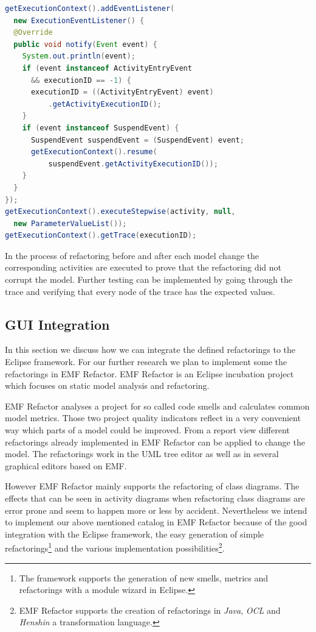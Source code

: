 \documentclass{llncs}
\begin{document}
\begin{lstlisting}[language=Java,caption=Executing the activity stepwise and getting the execution trace,label=lst:execution]
getExecutionContext().addEventListener(
  new ExecutionEventListener() {
  @Override
  public void notify(Event event) {
    System.out.println(event);
    if (event instanceof ActivityEntryEvent 
      && executionID == -1) {
      executionID = ((ActivityEntryEvent) event)
          .getActivityExecutionID();
    }
    if (event instanceof SuspendEvent) {
      SuspendEvent suspendEvent = (SuspendEvent) event;
      getExecutionContext().resume(
          suspendEvent.getActivityExecutionID());
    }
  }
});
getExecutionContext().executeStepwise(activity, null, 
  new ParameterValueList());
getExecutionContext().getTrace(executionID);
\end{lstlisting}

In the process of refactoring before and after each model change the corresponding activities are executed to prove that 
the refactoring did not corrupt the model. 
Further testing can be implemented by going through the trace and verifying 
that every node of the trace has the expected values.

\subsection{GUI Integration}
\label{sec:guiintegration}
In this section we discuss how we can integrate the defined refactorings to the Eclipse framework. For our further 
research we plan to implement some the refactorings in EMF Refactor. EMF Refactor is an Eclipse incubation project 
which focuses on static model analysis and refactoring.

EMF Refactor analyses a project for so called code smells and calculates common model metrics. Those two project quality 
indicators reflect in a very convenient way which parts of a model could be improved. From a report view different 
refactorings already implemented in EMF Refactor can be applied to change the model. The refactorings work in the UML tree 
editor as well as in several graphical editors based on EMF.

However EMF Refactor mainly supports the refactoring of class diagrams. The effects that can be seen in activity diagrams 
when refactoring class diagrams are error prone and seem to happen more or less by accident. Nevertheless we intend to 
implement our above mentioned catalog in EMF Refactor because of the good integration with the Eclipse framework, the 
easy generation of simple refactorings\footnote{The framework supports the generation of new smells, metrics and 
refactorings with a module wizard in Eclipse.} and the various implementation possibilities\footnote{EMF Refactor 
supports the creation of refactorings in \textit{Java}, \textit{OCL} and \textit{Henshin} a transformation language.}.
\end{document}
